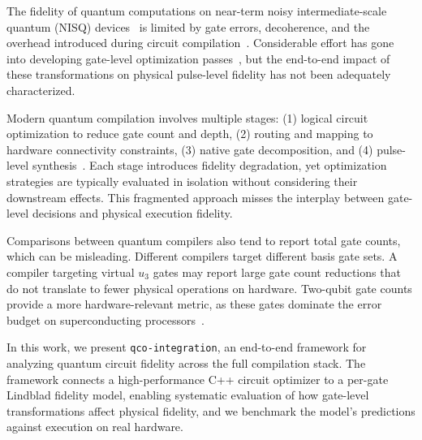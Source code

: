 \documentclass[sigconf,nonacm]{acmart}
\begin{document}
The fidelity of quantum computations on near-term noisy intermediate-scale quantum (NISQ) devices~\cite{preskill2018quantum} is limited by gate errors, decoherence, and the overhead introduced during circuit compilation~\cite{arute2019quantum,kim2023evidence}. Considerable effort has gone into developing gate-level optimization passes~\cite{nam2018automated,kissinger2020reducing,lubasch2025tensor}, but the end-to-end impact of these transformations on physical pulse-level fidelity has not been adequately characterized.

Modern quantum compilation involves multiple stages: (1) logical circuit optimization to reduce gate count and depth, (2) routing and mapping to hardware connectivity constraints, (3) native gate decomposition, and (4) pulse-level synthesis~\cite{shi2019optimized}. Each stage introduces fidelity degradation, yet optimization strategies are typically evaluated in isolation without considering their downstream effects. This fragmented approach misses the interplay between gate-level decisions and physical execution fidelity.

Comparisons between quantum compilers also tend to report total gate counts, which can be misleading. Different compilers target different basis gate sets. A compiler targeting virtual $u_3$ gates may report large gate count reductions that do not translate to fewer physical operations on hardware. Two-qubit gate counts provide a more hardware-relevant metric, as these gates dominate the error budget on superconducting processors~\cite{iqm2024garnet}.

In this work, we present \texttt{qco-integration}, an end-to-end framework for analyzing quantum circuit fidelity across the full compilation stack. The framework connects a high-performance C++ circuit optimizer to a per-gate Lindblad fidelity model, enabling systematic evaluation of how gate-level transformations affect physical fidelity, and we benchmark the model's predictions against execution on real hardware.
\end{document}
